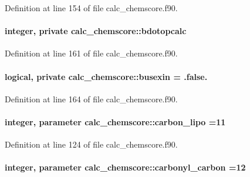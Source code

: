 Definition at line 154 of file calc\-\_\-chemscore.\-f90.

\hypertarget{classcalc__chemscore_aaefd70da86dc7e096e752cb92073e59a}{
\paragraph[{bdotopcalc}]{\setlength{\rightskip}{0pt plus 5cm}integer, private calc\-\_\-chemscore\-::bdotopcalc\hspace{0.3cm}{\ttfamily [private]}}}\label{classcalc__chemscore_aaefd70da86dc7e096e752cb92073e59a}


Definition at line 161 of file calc\-\_\-chemscore.\-f90.

\hypertarget{classcalc__chemscore_a33ff8ef2871f086a64634d3af142e368}{
\paragraph[{busexin}]{\setlength{\rightskip}{0pt plus 5cm}logical, private calc\-\_\-chemscore\-::busexin = .false.\hspace{0.3cm}{\ttfamily [private]}}}\label{classcalc__chemscore_a33ff8ef2871f086a64634d3af142e368}


Definition at line 164 of file calc\-\_\-chemscore.\-f90.

\hypertarget{classcalc__chemscore_a24ac03a6e52902f5474d7bf0636d1b8d}{
\paragraph[{carbon\-\_\-lipo}]{\setlength{\rightskip}{0pt plus 5cm}integer, parameter calc\-\_\-chemscore\-::carbon\-\_\-lipo =11}}\label{classcalc__chemscore_a24ac03a6e52902f5474d7bf0636d1b8d}


Definition at line 124 of file calc\-\_\-chemscore.\-f90.

\hypertarget{classcalc__chemscore_af75eb4e985bdc19e748fddbce9488d0e}{
\paragraph[{carbonyl\-\_\-carbon}]{\setlength{\rightskip}{0pt plus 5cm}integer, parameter calc\-\_\-chemscore\-::carbonyl\-\_\-carbon =12}}\label{classcalc__chemscore_af75eb4e985bdc19e748fddbce9488d0e}


